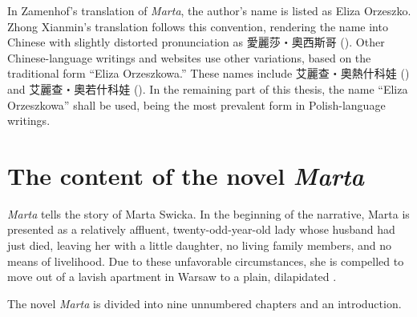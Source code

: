 In Zamenhof's translation of \textit{Marta}, the author's name is listed as Eliza Orzeszko.
Zhong Xianmin's translation follows this convention, rendering the name into Chinese with slightly distorted pronunciation as 愛麗莎・奧西斯哥 ().
Other Chinese-language writings and websites use other variations, based on the traditional form ``Eliza Orzeszkowa.''
These names include 艾麗查・奧熱什科娃 () and 艾麗查・奧若什科娃 (). In the remaining part of this thesis, the name ``Eliza Orzeszkowa'' shall be used, being the most prevalent form in Polish-language writings.
\section{The content of the novel \textit{Marta}}
\textit{Marta} tells the story of Marta Swicka.
In the beginning of the narrative, Marta is presented as a relatively affluent, twenty-odd-year-old lady whose husband had just died, leaving her with a little daughter, no living family members, and no means of livelihood.
Due to these unfavorable circumstances, she is compelled to move out of a lavish apartment in Warsaw to a plain, dilapidated .

The novel \textit{Marta} is divided into nine unnumbered chapters and an introduction. 
